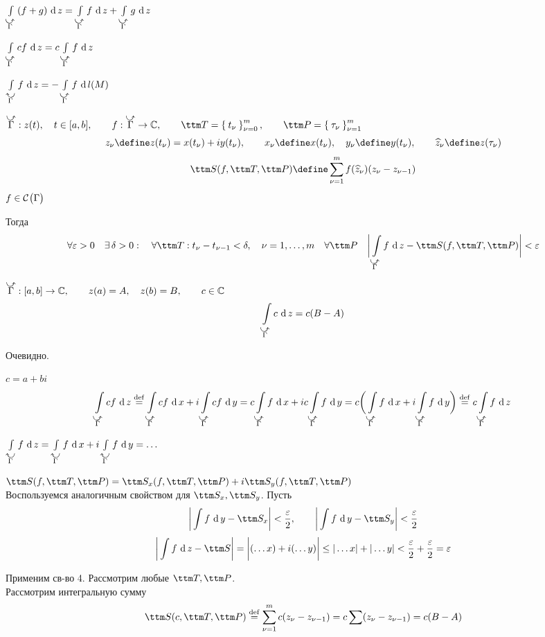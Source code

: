 \begin{props}
	\item $ \cint[z]{\curvedir\Gamma}{(f + g)} = \cint[z]{\curvedir\Gamma}f + \cint[z]{\curvedir\Gamma}g $

	\item $ \cint[z]{\curvedir\Gamma}{cf} = c \cint[z]{\curvedir\Gamma}f $

	\item $ \cint[z]{\curvedir[0]\Gamma}f = - \cint{\curvedir\Gamma}f $

	\item $ \curvedir\Gamma : z(t), \quad t \in [a, b], \qquad f : \curvedir\Gamma \to \Co, \qquad \ttm T = \seqz[m]{t_\nu}\nu, \qquad \ttm P = \seq[m]{\tau_\nu}\nu $
	$$ z_\nu \define z(t_\nu) = x(t_\nu) + iy(t_\nu), \qquad x_\nu \define x(t_\nu), \quad y_\nu \define y(t_\nu), \qquad \hat z_\nu \define z(\tau_\nu) $$
	$$ \ttm S(f, \ttm T, \ttm P) \define \sum_{\nu = 1}^m f(\hat z_\nu) (z_\nu - z_{\nu - 1}) $$
	$ f \in \mathcal{C}^{} \big( {\Gamma} \big)  $

	Тогда
	$$ \forall \veps > 0 \quad \exist \delta > 0 : \quad \forall \ttm T : t_\nu - t_{\nu - 1} < \delta, \quad \nu = 1, \dots, m \quad \forall \ttm P \quad \bigg| \cint[z]{\curvedir\Gamma}f - \ttm S(f, \ttm T, \ttm P) \bigg| < \veps $$

	\item $ \curvedir\Gamma : [a, b] \to \Co, \qquad z(a) = A, \quad z(b) = B, \qquad c \in \Co $
	$$ \cint[z]{\curvedir\Gamma}c = c(B - A) $$
\end{props}

\begin{eproof}
	\item Очевидно.

	\item $ c = a + bi $
	$$ \cint[z]{\curvedir\Gamma}{cf} \bydef \cint[x]{\curvedir\Gamma}{cf} + i \cint[y]{\curvedir\Gamma}{cf} = c \cint[x]{\curvedir\Gamma}f + ic \cint[y]{\curvedir\Gamma}f = c \bigg( \cint[x]{\curvedir\Gamma}f + i \cint[y]{\curvedir\Gamma}f \bigg) \bydef c \cint[z]{\curvedir\Gamma}f $$

	\item $ \cint[z]{\curvedir[0]\Gamma}f = \cint[x]{\curvedir[0]\Gamma}f + i \cint[y]{\curvedir[0]\Gamma}f = \dots $

	\item $ \ttm S(f, \ttm T, \ttm P) = \ttm S_x(f, \ttm T, \ttm P) + i \ttm S_y(f, \ttm T, \ttm P) $ \\
	Воспользуемся аналогичным свойством для $ \ttm S_x, \ttm S_y $. Пусть
	$$ \bigg| \sint[y]f - \ttm S_x \bigg| < \frac\veps2, \qquad \bigg| \sint[y]f - \ttm S_y \bigg| < \frac\veps2 $$
	$$ \bigg| \sint[z]f - \ttm S \bigg| = \bigg| (\dots x) + i(\dots y) \bigg| \le |\dots x| + |\dots y| < \frac\veps2 + \frac\veps2 = \veps $$

	\item Применим св-во 4. Рассмотрим любые $ \ttm T, \ttm P $. \\
	Рассмотрим интегральную сумму
	$$ \ttm S(c, \ttm T, \ttm P) \bydef \sum_{\nu = 1}^m c(z_\nu - z_{\nu - 1}) = c \sum (z_\nu - z_{\nu - 1}) = c(B - A) $$
\end{eproof}
